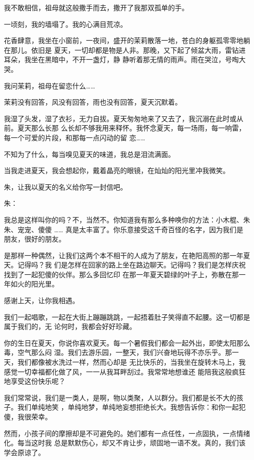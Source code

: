 \documentclass[12pt,a4paper]{article}
\begin{document}
		我不敢相信，祖母就这般撒手而去，撒开了我那双孤单的手。

		一顷刻，我的墙塌了。我的心满目荒凉。

		花香肆意，我坐在小窗前，一夜间，盛开的茉莉散落一地，苍白的身躯孤零零地躺在那儿。依旧是
	夏天，一切却都是物是人非。那晚，又下起了倾盆大雨，雷钻进耳朵，我坐在黑暗中，不开一盏灯，静
	静听着那无情的雨声。雨在哭泣，号啕大哭。

		我问茉莉，祖母在留恋什么……

		茉莉没有回答，风没有回答，雨也没有回答，夏天沉默着。

		我湿了头发，湿了衣衫，无力自拔。夏天匆匆地来了又去了，我沉溺在此时或从前。夏天那么长那
	么长却不够我用来释怀。我怀念夏天，每一场雨，每一响雷，每一个可爱的片段，和那每一点闪动的留
	恋……

		不知为了什么，每当嗅见夏天的味道，我总是泪流满面。

	\endwriting



		当我走进夏天，我会想起你，戴着晶亮的眼镜，在灿灿的阳光里冲我微笑。

		朱，让我以夏天的名义给你写一封信吧。

		朱：

		我总是这样叫你的吗？不，当然不。你知道我有那么多种唤你的方法：小木棍、朱朱、宠宠、傻傻
	…… 真是太丰富了。你乐意接受这千奇百怪的名字，因为我们是朋友，很好的朋友。

		是那样一种偶然，让我们这两个本不相干的人成为了朋友，在艳阳高照的那一年夏天。记得吗？我
	们是怎样在回家的路上坐在路边聊天。记得吗？我们是怎样庆祝找到了一起犯傻的伙伴。那么多回忆印
	在那一年夏天碧绿的叶子上，弥散在那一年如火的阳光里。

		感谢上天，让你我相遇。

		我们一起唱歌，一起在大街上蹦蹦跳跳，一起捂着肚子笑得直不起腰。这一切都是属于我们的，无
	论何时，我都会好好珍藏。

		你的生日在夏天，你说你喜欢夏天。每一个暑假我们都会一起外出，即使太阳那么毒，空气那么闷
	湿。我们去游乐园，一整天，我们兴奋地玩得不亦乐乎。那一天，我们都像被水洗过一样，然而心却是
	无比快乐的，当我坐在旋转木马上，我感觉一切幸福都化做了风，一一从我耳畔刮过。我常常地想谁还
	能陪我这般疯狂地享受这份快乐呢？

		我们常常说，我们是一类人，是啊，物以类聚，人以群分。我们都是长不大的孩子。我们单纯地笑
	，单纯地梦，单纯地妄想拒绝长大。我想告诉你：和你一起犯傻，我很荣幸。

		然而，小孩子间的摩擦却是不可避免的。她们都有一点任性，一点固执，一点情绪化。每当这时我
	总是默默伤心，却又不肯让步，顽固地一语不发。真的，我们该学会原谅了。
\end{document}
